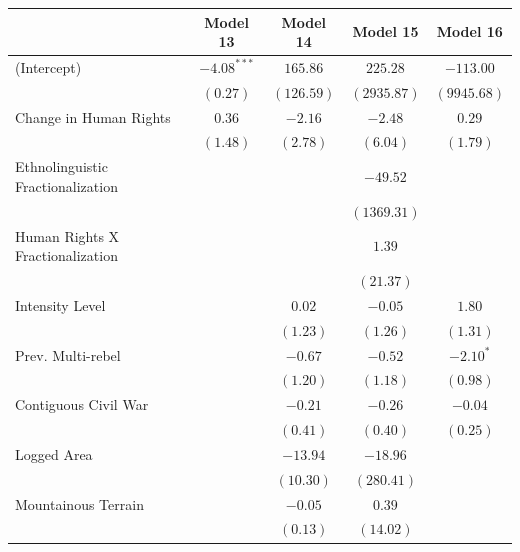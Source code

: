 \documentclass[12pt,]{book}
\let\origtable\table
\let\endorigtable\endtable
\renewenvironment{table}[1][2] {
    \singlespacing
    \expandafter\origtable\expandafter[H]
} {
    \endorigtable
}
\theoremstyle{definition}
\theoremstyle{definition}
\theoremstyle{definition}
\theoremstyle{remark}
\begin{document}
\begin{table}
\begin{center}
\begin{tabular}{l c c c c }
\hline
 & Model 13 & Model 14 & Model 15 & Model 16 \\
\hline
(Intercept)                       & $-4.08^{***}$ & $165.86$   & $225.28$    & $-113.00$   \\
                                  & $(0.27)$      & $(126.59)$ & $(2935.87)$ & $(9945.68)$ \\
Change in Human Rights            & $0.36$        & $-2.16$    & $-2.48$     & $0.29$      \\
                                  & $(1.48)$      & $(2.78)$   & $(6.04)$    & $(1.79)$    \\
Ethnolinguistic Fractionalization &               &            & $-49.52$    &             \\
                                  &               &            & $(1369.31)$ &             \\
Human Rights X Fractionalization  &               &            & $1.39$      &             \\
                                  &               &            & $(21.37)$   &             \\
Intensity Level                   &               & $0.02$     & $-0.05$     & $1.80$      \\
                                  &               & $(1.23)$   & $(1.26)$    & $(1.31)$    \\
Prev. Multi-rebel                 &               & $-0.67$    & $-0.52$     & $-2.10^{*}$ \\
                                  &               & $(1.20)$   & $(1.18)$    & $(0.98)$    \\
Contiguous Civil War              &               & $-0.21$    & $-0.26$     & $-0.04$     \\
                                  &               & $(0.41)$   & $(0.40)$    & $(0.25)$    \\
Logged Area                       &               & $-13.94$   & $-18.96$    &             \\
                                  &               & $(10.30)$  & $(280.41)$  &             \\
Mountainous Terrain               &               & $-0.05$    & $0.39$      &             \\
                                  &               & $(0.13)$   & $(14.02)$   &             \\

\end{tabular}
\end{center}
\end{table}
\end{document}
